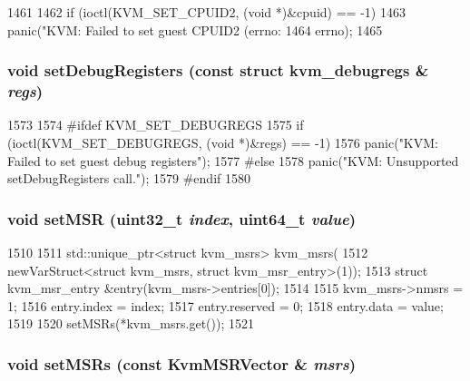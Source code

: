 \begin{DoxyCode}
1461 {
1462     if (ioctl(KVM_SET_CPUID2, (void *)&cpuid) == -1)
1463         panic("KVM: Failed to set guest CPUID2 (errno: %
1464               errno);
1465 }
\end{DoxyCode}
\hypertarget{classX86KvmCPU_a0c0b94046f41e2b83c8f224e9f227d0f}{
\subsubsection[{setDebugRegisters}]{\setlength{\rightskip}{0pt plus 5cm}void setDebugRegisters (const struct kvm\_\-debugregs \& {\em regs})}}
\label{classX86KvmCPU_a0c0b94046f41e2b83c8f224e9f227d0f}



\begin{DoxyCode}
1573 {
1574 #ifdef KVM_SET_DEBUGREGS
1575     if (ioctl(KVM_SET_DEBUGREGS, (void *)&regs) == -1)
1576         panic("KVM: Failed to set guest debug registers\n");
1577 #else
1578     panic("KVM: Unsupported setDebugRegisters call.\n");
1579 #endif
1580 }
\end{DoxyCode}
\hypertarget{classX86KvmCPU_a3d32029e1dfb4da512897794d56e9fc8}{
\subsubsection[{setMSR}]{\setlength{\rightskip}{0pt plus 5cm}void setMSR ({\bf uint32\_\-t} {\em index}, \/  uint64\_\-t {\em value})}}
\label{classX86KvmCPU_a3d32029e1dfb4da512897794d56e9fc8}



\begin{DoxyCode}
1510 {
1511     std::unique_ptr<struct kvm_msrs> kvm_msrs(
1512         newVarStruct<struct kvm_msrs, struct kvm_msr_entry>(1));
1513     struct kvm_msr_entry &entry(kvm_msrs->entries[0]);
1514 
1515     kvm_msrs->nmsrs = 1;
1516     entry.index = index;
1517     entry.reserved = 0;
1518     entry.data = value;
1519 
1520     setMSRs(*kvm_msrs.get());
1521 }
\end{DoxyCode}
\hypertarget{classX86KvmCPU_acc0ac79f886623c5e0ce73b393402148}{
\subsubsection[{setMSRs}]{\setlength{\rightskip}{0pt plus 5cm}void setMSRs (const {\bf KvmMSRVector} \& {\em msrs})}}
\label{classX86KvmCPU_acc0ac79f886623c5e0ce73b393402148}



